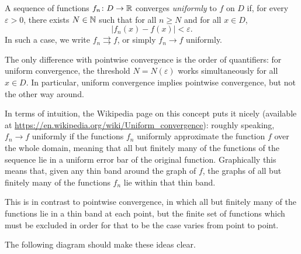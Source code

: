 \documentclass[../analysis1.tex]{subfiles}
\begin{document}
\begin{definition}
    \begin{shaded*}
        A sequence of functions $f_n \colon D\to \mathbb{R}$ converges \textit{uniformly} to $f$ on $D$ if, for every $\varepsilon > 0$, there exists $N\in\mathbb{N}$ such that for all $n \ge N$ and for all $x \in D$,
        \[
            |f_n(x) - f(x)| < \varepsilon.
        \]
        In such a case, we write $f_n\rightrightarrows f$, or simply $f_n\to f$ uniformly.
    \end{shaded*}
\end{definition}

\begin{remark}
    The only difference with pointwise convergence is the order of quantifiers: for uniform convergence, the threshold $N= N(\varepsilon)$ works simultaneously for all $x\in D$. In particular, uniform convergence implies pointwise convergence, but not the other way around.
\end{remark}

In terms of intuition, the Wikipedia page on this concept puts it nicely (available at \url{https://en.wikipedia.org/wiki/Uniform_convergence}): roughly speaking, $f_n\to f$ uniformly if the functions $f_n$ uniformly approximate the function
$f$ over the whole domain, meaning that all but finitely many of the functions of the sequence lie in a uniform error bar of the original function. Graphically this means that, given any thin band around the graph of $f$, the graphs of all but finitely many of the functions $f_n$ lie within that thin band.

This is in contrast to pointwise convergence, in which all but finitely many of the functions lie in a thin band at each point, but the finite set of functions which must be excluded in order for that to be the case varies from point to point.

The following diagram should make these ideas clear.
\end{document}

